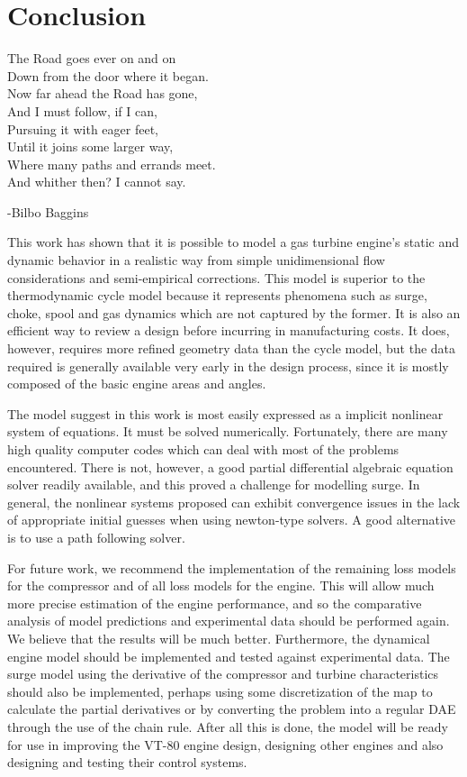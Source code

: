 \chapter{Conclusion}
\label{ch:conclusion}
        \epigraph{\centering
        The Road goes ever on and on     \\
        Down from the door where it began.\\
        Now far ahead the Road has gone,\\
        And I must follow, if I can,\\
        Pursuing it with eager feet,\\
        Until it joins some larger way,\\
        Where many paths and errands meet.\\
        And whither then? I cannot say.
        }{-Bilbo Baggins}

        This work has shown that it is possible to model a gas turbine engine's static and dynamic behavior in a realistic way from simple unidimensional flow considerations 
        and semi-empirical corrections. This model is superior to the thermodynamic cycle model because it represents phenomena such as surge, choke, spool and gas dynamics 
        which are not captured by the former. It is also an efficient way to review a design before incurring in manufacturing costs.
        It does, however, requires more refined geometry data than the cycle model, but the data required is generally available very early in the design process, since it is mostly composed of the basic engine areas and angles.
        
        The model suggest in this work is most easily expressed as a implicit nonlinear system of equations. 
        It must be solved numerically. Fortunately, there are many high quality computer codes which can deal with most of the problems encountered.
        There is not, however, a good partial differential algebraic equation solver readily available, and this proved a challenge for modelling surge.
        In general, the nonlinear systems proposed can exhibit convergence issues in the lack of appropriate initial guesses when using newton-type solvers.
        A good alternative is to use a path following solver.

        For future work, we recommend the implementation of the remaining loss models for the compressor and of all loss models for the engine.
        This will allow much more precise estimation of the engine performance, and so the comparative analysis of model predictions and experimental data should be performed again. 
        We believe that the results will be much better.
        Furthermore, the dynamical engine model should be implemented and tested against experimental data. The surge model using the derivative of the compressor and turbine characteristics should also be implemented, perhaps using some discretization of the map to calculate the partial derivatives or by converting the problem into a regular \ac{DAE} through the use of the chain rule.
        After all this is done, the model will be ready for use in improving the VT-80 engine design, designing other engines and also designing and testing their control systems.

